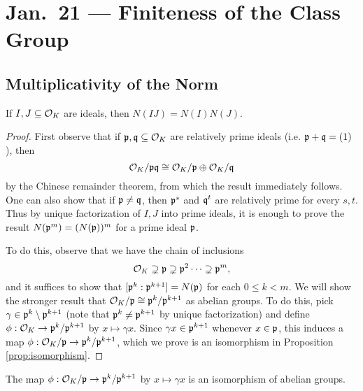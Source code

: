 \chapter{Jan.~21 --- Finiteness of the Class Group}

\section{Multiplicativity of the Norm}

\begin{theorem}
  If $I, J \subseteq \mathcal{O}_K$ are ideals, then
  $N(IJ) = N(I) N(J)$.
\end{theorem}

\begin{proof}
  First observe that if $\mathfrak{p}, \mathfrak{q} \subseteq \mathcal{O}_K$ are
  relatively prime ideals (i.e. $\mathfrak{p} + \mathfrak{q} = (1)$), then
  \[
    \mathcal{O}_K / \mathfrak{p} \mathfrak{q} \cong \mathcal{O}_K / \mathfrak{p} \oplus \mathcal{O}_K / \mathfrak{q}
  \]
  by the Chinese remainder theorem, from which
  the result immediately follows. One can also
  show that if $\mathfrak{p} \ne \mathfrak{q}$, then
  $\mathfrak{p}^s$ and $\mathfrak{q}^t$ are relatively prime for every
  $s, t$. Thus by unique factorization of $I, J$ into
  prime ideals,
  it is enough to prove the result $N(\mathfrak{p}^m) = (N(\mathfrak{p}))^m$
  for a prime ideal $\mathfrak{p}$.

  To do this, observe that we have the chain of inclusions
  \[
    \mathcal{O}_K \supsetneq \mathfrak{p} \supsetneq \mathfrak{p}^2 \dots \supsetneq \mathfrak{p}^m,
  \]
  and it suffices to show that $[\mathfrak{p}^k : \mathfrak{p}^{k + 1}] = N(\mathfrak{p})$
  for each $0 \le k < m$. We will show the
  stronger result that $\mathcal{O}_K / \mathfrak{p} \cong \mathfrak{p}^k / \mathfrak{p}^{k + 1}$
  as abelian groups. To do this, pick
  $\gamma \in \mathfrak{p}^k \setminus \mathfrak{p}^{k + 1}$ (note
  that $\mathfrak{p}^k \ne \mathfrak{p}^{k + 1}$ by unique factorization)
  and define $\phi : \mathcal{O}_K \to \mathfrak{p}^k / \mathfrak{p}^{k + 1}$
  by $x \mapsto \gamma x$. Since $\gamma x \in \mathfrak{p}^{k + 1}$
  whenever $x \in \mathfrak{p}$, this induces a map
  $\phi : \mathcal{O}_K / \mathfrak{p} \to \mathfrak{p}^k / \mathfrak{p}^{k + 1}$, which
  we prove is an isomorphism in Proposition
  \ref{prop:isomorphism}.
\end{proof}

\begin{prop}\label{prop:isomorphism}
  The map $\phi : \mathcal{O}_K / \mathfrak{p} \to \mathfrak{p}^k / \mathfrak{p}^{k + 1}$
  by $x \mapsto \gamma x$ is an isomorphism
  of abelian groups.
\end{prop}


